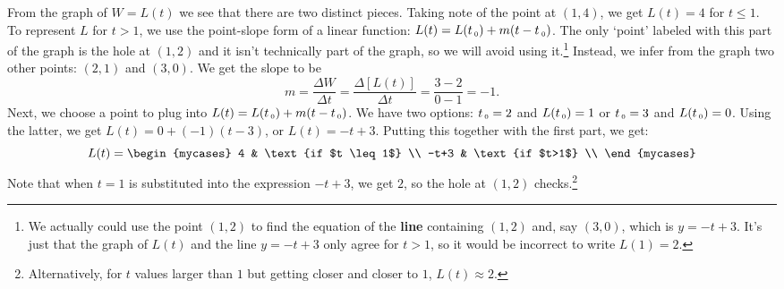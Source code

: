 \documentclass{ximera}
\begin{document}
\begin{example}
\begin{center}
\end{center}


\begin{explanation} 
From the graph of $W = L(t)$ we see that there are two distinct pieces. Taking note of the point at $(1, 4)$, we get $L(t) = 4$ for $t \leq 1$.  To represent $L$ for $t>1$, we use the point-slope form of a linear function: $L(t) = L(t_{\,\mbox{\tiny $0$}}) + m(t - t_{\mbox{\,\tiny $0$}})$.  The only `point' labeled with this part of the graph is the hole at $(1, 2)$ and it isn't technically part of the graph, so we will avoid using it.\footnote{We actually could use the point $(1, 2)$ to find the equation of the \textbf{line} containing $(1, 2)$ and, say $(3, 0)$, which is $y = -t + 3$.  It's just that the graph of $L(t)$ and the line $y = -t + 3$ only agree for $t > 1$, so it would be incorrect to write $L(1) = 2$.}  Instead, we infer from the graph two other points: $(2, 1)$ and $(3, 0)$.  We get the slope to be \[m = \dfrac{\Delta W}{\Delta t} = \dfrac{\Delta [L(t)]}{\Delta t} = \dfrac{3 - 2}{0 - 1} = -1.\] Next, we choose a point to plug into  $L(t) = L(t_{\,\mbox{\tiny $0$}}) + m(t - t_{\,\mbox{\tiny $0$}})$.  We have two options:  $t_{\,\mbox{\tiny $0$}} = 2$ and $L(t_{\,\mbox{\tiny $0$}}) = 1$ or $t_{\,\mbox{\tiny $0$}} = 3$ and $L(t_{\,\mbox{\tiny $0$}}) = 0$.  Using the latter, we get $L(t) = 0 + (-1)(t - 3)$, or $L(t) = -t + 3$.  Putting this together with the first part, we get: \[ L(t) = \begin{mycases} 
      4 &  \text{if $t \leq 1$} \\
      -t+3   & \text{if $t>1$} \\
   \end{mycases}
\] Note that when $t = 1$ is substituted into the expression $-t + 3$, we get $2$, so the hole at $(1, 2)$ checks.\footnote{Alternatively, for $t$ values larger than $1$ but getting closer and closer to $1$, $L(t) \approx 2$.} 
\end{explanation}

\end{example}
\end{document}
